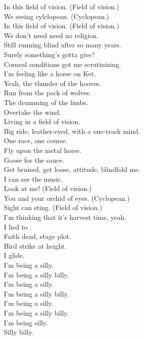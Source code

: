 In this field of vision. (Field of vision.) \\
We seeing cylclopean. (Cyclopean.) \\
In this field of vision. (Field of vision.) \\
We don't need need no religion. \\

Still running blind after so many years. \\
Surely something's gotta give? \\
Corneal conditions got me scrutinizing. \\
I'm feeling like a horse on Ket. \\
Yeah, the thunder of the hooves. \\
Run from the pack of wolves. \\
The drumming of the limbs. \\
Overtake the wind. \\
Living in a field of vision. \\

Big ride, leather-eyed, with a one-track mind. \\
One race, one course. \\
Fly upon the metal horse. \\
Goose for the sauce. \\
Get bruised, get loose, attitude, blindfold me. \\
I can see the music. \\

Look at me! (Field of vision.) \\
You and your orchid of eyes. (Cyclopean.) \\
Sight can sting. (Field of vision.) \\
I'm thinking that it's harvest time, yeah. \\

I lied to . \\
Faith dead, stage plot. \\
Bird strike at height. \\
I glide. \\

I'm being a silly. \\
I'm being a silly billy. \\
I'm being a silly. \\
I'm being a silly billy. \\
I'm being a silly. \\
I'm being a silly billy. \\
I'm being silly. \\
Silly billy. \\

